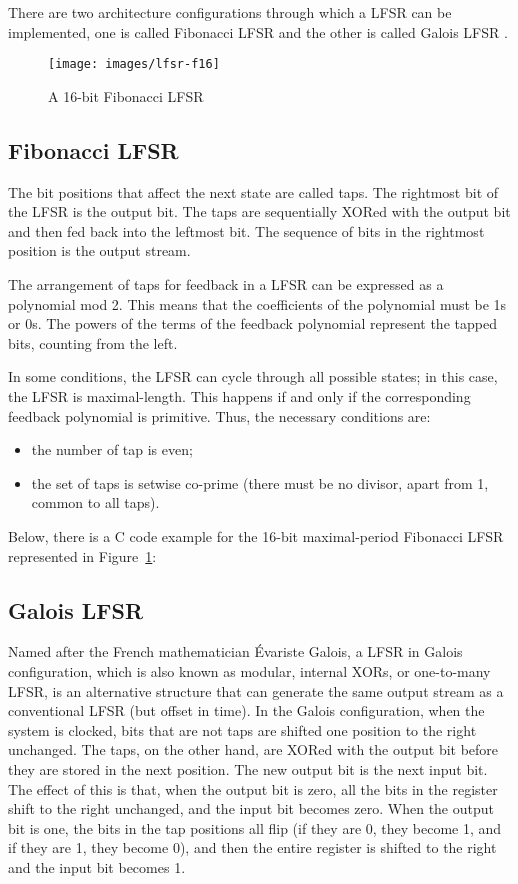 \documentclass[11pt,a4paper,oneside, openright]{article}
\begin{document}
There are two architecture configurations through which a LFSR can be implemented, one is called Fibonacci LFSR and the other is called Galois LFSR \cite{lfsr}.

\begin{figure}[!b]
    \centering
    \texttt{[image: images/lfsr-f16]}
    \caption{A 16-bit Fibonacci LFSR}
    \label{fig:lfsr-f16}
\end{figure}

\subsection{Fibonacci LFSR}
The bit positions that affect the next state are called taps. The rightmost bit of the LFSR is the output bit. The taps are sequentially XORed with the output bit and then fed back into the leftmost bit. The sequence of bits in the rightmost position is the output stream.

The arrangement of taps for feedback in a LFSR can be expressed as a polynomial mod 2. This means that the coefficients of the polynomial must be 1s or 0s. The powers of the terms of the feedback polynomial represent the tapped bits, counting from the left.

In some conditions, the LFSR can cycle through all possible states; in this case, the LFSR is maximal-length. This happens if and only if the corresponding feedback polynomial is primitive. Thus, the necessary conditions are:
\begin{itemize}
    \item the number of tap is even;
    \item the set of taps is setwise co-prime (there must be no divisor, apart from 1, common to all taps).
\end{itemize}

Below, there is a C code example for the 16-bit maximal-period Fibonacci LFSR represented in Figure~\ref{fig:lfsr-f16}:




\subsection{Galois LFSR}
Named after the French mathematician Évariste Galois, a LFSR in Galois configuration, which is also known as modular, internal XORs, or one-to-many LFSR, is an alternative structure that can generate the same output stream as a conventional LFSR (but offset in time). In the Galois configuration, when the system is clocked, bits that are not taps are shifted one position to the right unchanged. The taps, on the other hand, are XORed with the output bit before they are stored in the next position. The new output bit is the next input bit. The effect of this is that, when the output bit is zero, all the bits in the register shift to the right unchanged, and the input bit becomes zero. When the output bit is one, the bits in the tap positions all flip (if they are 0, they become 1, and if they are 1, they become 0), and then the entire register is shifted to the right and the input bit becomes 1.
\end{document}
